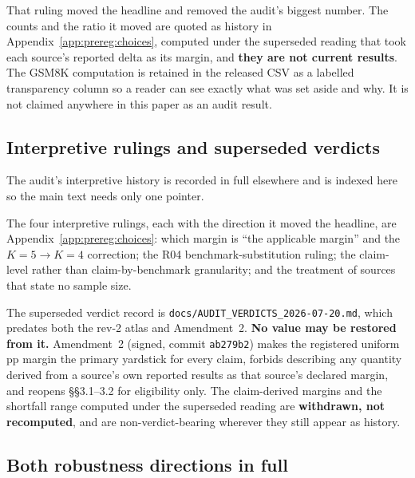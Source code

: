 That ruling moved the headline and removed the audit's biggest number. The counts
and the ratio it moved are quoted as history in
Appendix~\ref{app:prereg:choices}, computed under the superseded reading that
took each source's reported delta as its margin, and \textbf{they are not current
results}. The GSM8K computation is retained in the released CSV as a labelled
transparency column so a reader can see exactly what was set aside and why. It is
not claimed anywhere in this paper as an audit result.

\subsection{Interpretive rulings and superseded verdicts}
\label{app:audit:history}

The audit's interpretive history is recorded in full elsewhere and is indexed
here so the main text needs only one pointer.

The four interpretive rulings, each with the direction it moved the headline, are
Appendix~\ref{app:prereg:choices}: which margin is ``the applicable margin'' and
the $K = 5 \to K = 4$ correction; the R04 benchmark-substitution ruling; the
claim-level rather than claim-by-benchmark granularity; and the treatment of
sources that state no sample size.

The superseded verdict record is \texttt{docs/AUDIT\_\allowbreak{}VERDICTS\_\allowbreak{}2026-07-20.md}, which
predates both the rev-2 atlas and Amendment~2. \textbf{No value may be restored
from it.} Amendment~2 (signed, commit \texttt{ab279b2}) makes the registered
uniform \AuditMarginPP{}\,pp margin the primary yardstick for every claim,
forbids describing any quantity derived from a source's own reported results as
that source's declared margin, and reopens \S\S3.1--3.2 for eligibility only. The
claim-derived margins and the shortfall range computed under the superseded
reading are \textbf{withdrawn, not recomputed}, and are non-verdict-bearing
wherever they still appear as history.

\subsection{Both robustness directions in full}
\label{app:audit:fullrobustness}

